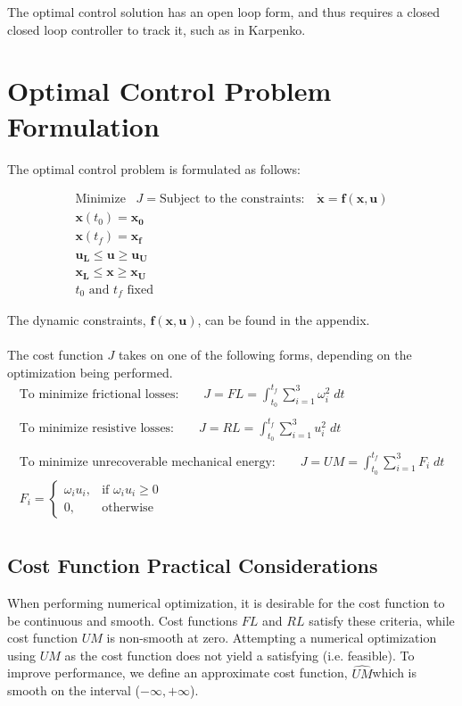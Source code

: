 \documentclass[]{aiaa-tc}%
\begin{document}
The optimal control solution has an open loop form, and thus requires a closed closed loop controller to track it, such as in Karpenko\cite{Karpenko2014}.


\section{Optimal Control Problem Formulation}

The optimal control problem is formulated as follows:

\begin{align*}
	\text{Minimize} \;\;\; J = 
	\text{Subject to the constraints}: \;\;\; \mathbf{\dot{x}} = \textbf{f}(\textbf{x},\textbf{u}) \\
	\mathbf{x}(t_{0}) = \mathbf{x_{0}}\\
	\mathbf{x}(t_{f}) = \mathbf{x_{f}}\\
	\mathbf{u_{L}} \leq \mathbf{u} \geq \mathbf{u_{U}} 	\\
	\mathbf{x_{L}} \leq \mathbf{x} \geq \mathbf{x_{U}} \\
	t_{0}\text{ and } t_{f} \text{ fixed}
\end{align*}

The dynamic constraints, $\textbf{f}(\textbf{x},\textbf{u})$, can be found in the appendix.\\ 
\\
The cost function $J$ takes on one of the following forms, depending on the optimization being performed.
\begin{align*}
\text{To minimize frictional losses:} \qquad
J = FL = \int_{t_{0}}^{t_{f}} \sum_{i = 1}^{3}\omega_{i}^{2} \; dt \\
\\
\text{To minimize resistive losses:} \qquad
J = RL = \int_{t_{0}}^{t_{f}} \sum_{i = 1}^{3}u_{i}^{2} \; dt \\
\\
\text{To minimize unrecoverable mechanical energy:}\qquad 
J=UM=\int_{t_{0}}^{t_{f}} \sum_{i = 1}^{3}F_{i} \; dt \\
	F_{i}  = \begin{cases}
    \omega_{i}u_{i},& \text{if } \omega_{i}u_{i}\geq 0\\
    0,              & \text{otherwise}
	\end{cases} \\
\end{align*}




\subsection{Cost Function Practical Considerations}
When performing numerical optimization, it is desirable for the cost function to be continuous and smooth. Cost functions $FL$ and $RL$ satisfy these criteria, while cost function $UM$ is non-smooth at zero. Attempting a numerical optimization using $UM$ as the cost function does not yield a satisfying (i.e. feasible). To improve performance, we define an approximate cost function, $\hat{UM}$which is smooth on the interval ($-\infty , +\infty$).
\end{document}
